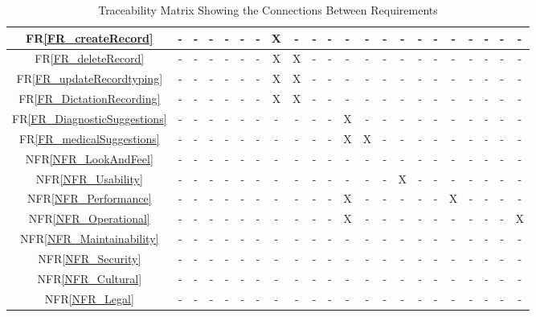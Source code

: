 \documentclass[12pt]{article}
\begin{document}
\begin{itemize}
\begin{landscape}
\begin{table}[H]
\begin{tabular}{|c|c|c|c|c|c|c|c|c|c|c|c|c|c|c|c|c|c|c|c|c|c|}
      FR\ref{FR_createRecord} & - & - & - & - & - & - & X & - & - & - & - & - & - & - & - & - & - & - & - & - & - \\ \hline
      FR\ref{FR_deleteRecord} & - & - & - & - & - & - & X & X & - & - & - & - & - & - & - & - & - & - & - & - & - \\ \hline
      FR\ref{FR_updateRecordtyping} & - & - & - & - & - & - & X & X &  - & - & - & - & - & - & - & - & - & - & - & - & - \\ \hline
      FR\ref{FR_DictationRecording} & - & - & - & - & - & - & X & X & - & - & - & - & - & - & - & - & - & - & - & - & - \\ \hline
      FR\ref{FR_DiagnosticSuggestions} & - & - & - & - & - & - & - & - & - & - & X & - & - & - & - & - & - & - & - & - & - \\ \hline
      FR\ref{FR_medicalSuggestions} & - & - & - & - & - & - & - & - & - & - & X & X & - & - & - & - & - & - & - & - & - \\ \hline
      NFR\ref{NFR_LookAndFeel} & - & - & - & - & - & - & - & - & - & - & - & - & -  & - & - & - & - & - & - & - & - \\ \hline
      NFR\ref{NFR_Usability} & - & - & - & - & - & - & - & - & - & - & - & - & - & X & - & - & - & - & - & - & - \\ \hline
      NFR\ref{NFR_Performance} & - & - & - & - & - & - & - & - & - & - & X & - & - & - & - & - & X & - & - & - & - \\ \hline
      NFR\ref{NFR_Operational} & - & - & - & - & - & - & - & - & - & - & X & -  & - & - & - & - & - & - & - & - & X \\ \hline
      NFR\ref{NFR_Maintainability} & - & - & - & - & - & - & - & - & - & - & - & - & - & - & - & - & - & - & - & - & - \\ \hline
      NFR\ref{NFR_Security} & - & - & - & - & - & - & - & - & - & - & - & - & - & - & - & - & - & - & - & - & - \\ \hline
      NFR\ref{NFR_Cultural} & - & - & - & - & - & - & - & - & - & - & - & - & - & - & - & - & - & - & - & - & - \\ \hline
      NFR\ref{NFR_Legal} & - & - & - & - & - & - & - & - & - & - & - & - & - & - & - & - & - & - & - & - & - \\ \hline
      \end{tabular}
      \caption{Traceability Matrix Showing the Connections Between Requirements}
      \label{Table:A_trace}
      \end{table}
    \end{landscape}




\end{itemize}
\end{document}
